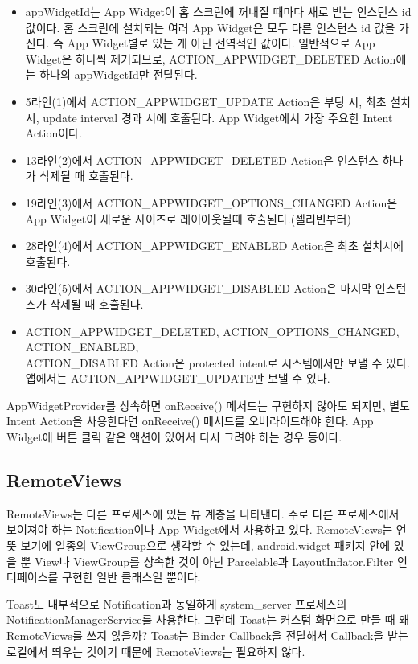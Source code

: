 \begin{itemize}
\item appWidgetId는 App Widget이 홈 스크린에 꺼내질 때마다 새로 받는 인스턴스 id 값이다. 홈 스크린에 설치되는 여러 App Widget은 모두 다른 인스턴스 id 값을 가진다. 즉 App Widget별로 있는 게 아닌 전역적인 값이다.
일반적으로 App Widget은 하나씩 제거되므로, ACTION\_APPWIDGET\_DELETED Action에는 하나의 appWidgetId만 전달된다.
\item 5라인(1)에서 ACTION\_APPWIDGET\_UPDATE Action은 부팅 시, 최초 설치 시, update interval 경과 시에 호출된다. App Widget에서 가장 주요한 Intent Action이다.
\item 13라인(2)에서 ACTION\_APPWIDGET\_DELETED Action은 인스턴스 하나가 삭제될 때 호출된다.
\item 19라인(3)에서 ACTION\_APPWIDGET\_OPTIONS\_CHANGED Action은 App Widget이 새로운 사이즈로 레이아웃될때 호출된다.(젤리빈부터)
\item 28라인(4)에서 ACTION\_APPWIDGET\_ENABLED Action은 최초 설치시에 호출된다.
\item 30라인(5)에서 ACTION\_APPWIDGET\_DISABLED Action은 마지막 인스턴스가 삭제될 때 호출된다.
\item ACTION\_APPWIDGET\_DELETED, ACTION\_OPTIONS\_CHANGED, ACTION\_ENABLED,\\
ACTION\_DISABLED Action은 protected intent로 시스템에서만 보낼 수 있다.
앱에서는 ACTION\_APP\-WIDGET\_UPDATE만 보낼 수 있다.
\end{itemize}

AppWidgetProvider를 상속하면 onReceive() 메서드는 구현하지 않아도 되지만, 별도 Intent Action을 사용한다면 onReceive() 메서드를 오버라이드해야 한다. App Widget에 버튼 클릭 같은 액션이 있어서 다시 그려야 하는 경우 등이다.\\

\subsection{RemoteViews}
RemoteViews는 다른 프로세스에 있는 뷰 계층을 나타낸다. 주로 다른 프로세스에서 보여져야 하는 Notification이나 App Widget에서 사용하고 있다.
RemoteViews는 언뜻 보기에 일종의 ViewGroup으로 생각할 수 있는데, android.widget 패키지 안에 있을 뿐 View나 ViewGroup를 상속한 것이 아닌 Parcelable과 LayoutInflator.Filter 인터페이스를 구현한 일반 클래스일 뿐이다.\\

\colorbox{tearose}{\parbox[t]{15cm}{
Toast도 내부적으로 Notification과 동일하게 system\_server 프로세스의 NotificationManagerService를 사용한다. 그런데 Toast는 커스텀 화면으로 만들 때 왜 RemoteViews를 쓰지 않을까? Toast는 Binder Callback을 전달해서 Callback을 받는 로컬에서 띄우는 것이기 때문에 RemoteViews는 필요하지 않다.
}}\newline\newline

